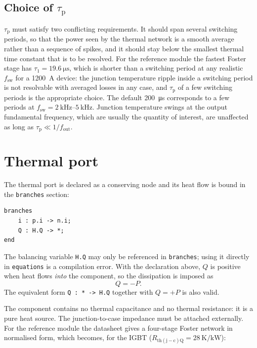 \documentclass[11pt,a4paper]{article}
\newcommand{\code}[1]{\texttt{\small #1}}
\begin{document}
\subsection{Choice of $\tau_\mathrm{p}$}

$\tau_\mathrm{p}$ must satisfy two conflicting requirements. It should span
several switching periods, so that the power seen by the thermal network is a
smooth average rather than a sequence of spikes, and it should stay below the
smallest thermal time constant that is to be resolved. For the reference module
the fastest Foster stage has $\tau_1 = \SI{19.6}{\micro\second}$, which is
shorter than a switching period at any realistic $f_\mathrm{sw}$ for a
\SI{1200}{\ampere} device: the junction temperature ripple inside a switching
period is not resolvable with averaged losses in any case, and
$\tau_\mathrm{p}$ of a few switching periods is the appropriate choice. The
default \SI{200}{\micro\second} corresponds to a few periods at
$f_\mathrm{sw} = \SIrange{2}{5}{\kilo\hertz}$. Junction temperature swings at
the output fundamental frequency, which are usually the quantity of interest,
are unaffected as long as $\tau_\mathrm{p} \ll 1/f_\mathrm{out}$.

\section{Thermal port}

The thermal port is declared as a conserving node and its heat flow is bound in
the \code{branches} section:
\begin{lstlisting}
branches
    i : p.i -> n.i;
    Q : H.Q -> *;
end
\end{lstlisting}
The balancing variable \code{H.Q} may only be referenced in \code{branches};
using it directly in \code{equations} is a compilation error. With the
declaration above, $Q$ is positive when heat flows \emph{into} the component,
so the dissipation is imposed as
\begin{equation}
  Q = -P .
\end{equation}
The equivalent form \code{Q : * -> H.Q} together with $Q = +P$ is also valid.

The component contains no thermal capacitance and no thermal resistance: it is a
pure heat source. The junction-to-case impedance must be attached externally.
For the reference module the datasheet gives a four-stage Foster network in
normalised form, which becomes, for the IGBT
($R_\mathrm{th(j-c)Q} = \SI{28}{\kelvin\per\kilo\watt}$):
\end{document}
